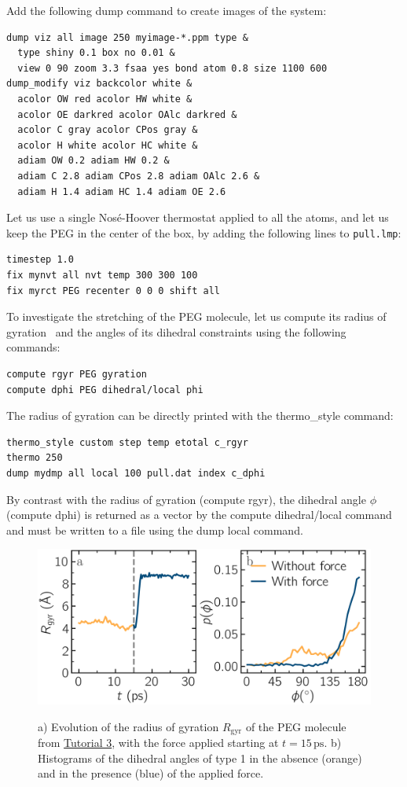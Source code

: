 \documentclass[9pt,tutorial]{livecoms}
\newcommand{\lmpcmd}[1]{\colorbox{listing}{\textcolor{command}{\small{#1}}}} %
\newcommand{\flecmd}[1]{\textcolor{command}{\texttt{#1}}} %
\begin{document}
Add the following \lmpcmd{dump} command to create images of the system:
\begin{lstlisting}
dump viz all image 250 myimage-*.ppm type &
  type shiny 0.1 box no 0.01 &
  view 0 90 zoom 3.3 fsaa yes bond atom 0.8 size 1100 600
dump_modify viz backcolor white &
  acolor OW red acolor HW white &
  acolor OE darkred acolor OAlc darkred &
  acolor C gray acolor CPos gray &
  acolor H white acolor HC white &
  adiam OW 0.2 adiam HW 0.2 &
  adiam C 2.8 adiam CPos 2.8 adiam OAlc 2.6 &
  adiam H 1.4 adiam HC 1.4 adiam OE 2.6
\end{lstlisting}
Let us use a single Nosé-Hoover thermostat applied to all the atoms,
and let us keep the PEG in the center of the box, by adding
the following lines to \flecmd{pull.lmp}:
\begin{lstlisting}
timestep 1.0
fix mynvt all nvt temp 300 300 100
fix myrct PEG recenter 0 0 0 shift all
\end{lstlisting}
To investigate the stretching of the PEG molecule, let us compute its radius of
gyration~\cite{fixmanRadiusGyrationPolymer1962a} and the angles of its dihedral
constraints using the following commands:
\begin{lstlisting}
compute rgyr PEG gyration
compute dphi PEG dihedral/local phi
\end{lstlisting}
The radius of gyration can be directly printed with the \lmpcmd{thermo\_style} command:
\begin{lstlisting}
thermo_style custom step temp etotal c_rgyr
thermo 250
dump mydmp all local 100 pull.dat index c_dphi
\end{lstlisting}
By contrast with the radius of gyration (compute \lmpcmd{rgyr}), the dihedral angle
$\phi$ (compute \lmpcmd{dphi}) is returned as a vector by the \lmpcmd{compute dihedral/local}
command and must be written to a file using the \lmpcmd{dump local} command.

\begin{figure}
\centering
\includegraphics[width=\linewidth]{PEG-distance}\\[-2ex]
\caption{a) Evolution of
the radius of gyration $R_\text{gyr}$ of the PEG molecule
from \hyperref[all-atom-label]{Tutorial 3}, with the force
applied starting at $t = 15\,\text{ps}$.  b) Histograms of the dihedral angles of type 1
in the absence (orange) and in the presence (blue) of the applied force.}
\label{fig:PEG-distance}
\end{figure}
\end{document}
